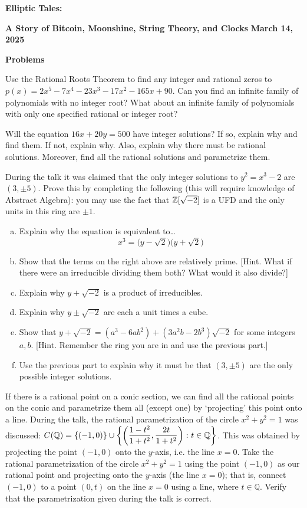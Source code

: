 \documentclass[11pt,letterpaper]{article}
\begin{document}
\begin{center}
{\bfseries\Large Elliptic Tales:} \par 
{\bfseries\large A Story of Bitcoin, Moonshine, String Theory, and Clocks} \pspace
{\bfseries\large March 14, 2025} \par\vspace{0.6cm}
{\large \bfseries Problems}
\end{center} 

\problem Use the Rational Roots Theorem to find any integer and rational zeros to $p(x)= 2x^5 - 7x^4 - 23x^3 - 17x^2 - 165x + 90$. Can you find an infinite family of polynomials with no integer root? What about an infinite family of polynomials with only one specified rational or integer root? \pspace

\problem Will the equation $16x + 20y= 500$ have integer solutions? If so, explain why and find them. If not, explain why. Also, explain why there must be rational solutions. Moreover, find all the rational solutions and parametrize them. \pspace

\problem During the talk it was claimed that the only integer solutions to $y^2= x^3 - 2$ are $(3, \pm 5)$. Prove this by completing the following (this will require knowledge of Abstract Algebra): you may use the fact that $\mathbb{Z}[\sqrt{-2}]$ is a UFD and the only units in this ring are $\pm 1$. 
	\begin{enumerate}[(a)]
	\item Explain why the equation is equivalent to\dots
		\[
		x^3= \big(y - \sqrt{2} \big) \big(y + \sqrt{2} \big)
		\]
	\item Show that the terms on the right above are relatively prime. [Hint. What if there were an irreducible dividing them both? What would it also divide?]
	\item Explain why $y + \sqrt{-2}$ is a product of irreducibles. 
	\item Explain why $y \pm \sqrt{-2}$ are each a unit times a cube. 
	\item Show that $y + \sqrt{-2}= (a^3 - 6ab^2) + (3a^2b - 2b^3) \sqrt{-2}$ for some integers $a, b$. [Hint. Remember the ring you are in and use the previous part.]
	\item Use the previous part to explain why it must be that $(3, \pm 5)$ are the only possible integer solutions. 
	\end{enumerate} \pspace

\problem If there is a rational point on a conic section, we can find all the rational points on the conic and parametrize them all (except one) by `projecting' this point onto a line. During the talk, the rational parametrization of the circle $x^2 + y^2= 1$ was discussed: $C(\mathbb{Q})= \{ (-1,0) \} \cup \left\{ \left(\dfrac{1-t^2}{1+t^2}, \dfrac{2t}{1+t^2} \right) \colon t \in \mathbb{Q} \right\}$. This was obtained by projecting the point $(-1, 0)$ onto the $y$-axis, i.e. the line $x= 0$. Take the rational parametrization of the circle $x^2 + y^2= 1$ using the point $(-1, 0)$ as our rational point and projecting onto the $y$-axis (the line $x= 0$); that is, connect $(-1, 0)$ to a point $(0, t)$ on the line $x= 0$ using a line, where $t \in \mathbb{Q}$. Verify that the parametrization given during the talk is correct. 
\end{document}
